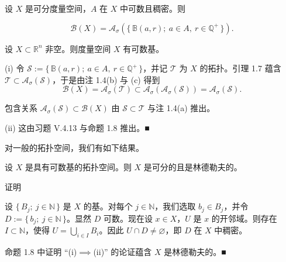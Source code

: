 \begin{corollary}

\begin{subitems}
\item

设 $ X $ 是可分度量空间，$ A $ 在 $ X $ 中可数且稠密。则

\[
\mathcal{B}(X) = \mathcal{A}_{\sigma}\left(\{\, \mathbb{B}(a, r) ;\ a \in A,\ r \in \mathbb{Q}^{+} \,\}\right) .
\]
\item

设 $ X \subset \mathbb{R}^{n} $ 非空。则度量空间 $ X $ 有可数基。

\proofhead
(i) 令 $ \mathcal{S} := \{\, \mathbb{B}(a, r) ;\ a \in A,\ r \in \mathbb{Q}^{+} \,\} $，并记 $ \mathcal{T} $ 为 $ X $ 的拓扑。引理 1.7 蕴含 $ \mathcal{T} \subset \mathcal{A}_{\sigma}(\mathcal{S}) $，于是由注 1.4(b) 与 (c) 得到
\[
\mathcal{B}(X) = \mathcal{A}_{\sigma}(\mathcal{T}) \subset \mathcal{A}_{\sigma}(\mathcal{A}_{\sigma}(\mathcal{S})) = \mathcal{A}_{\sigma}(\mathcal{S}) .
\]

包含关系 $ \mathcal{A}_{\sigma}(\mathcal{S}) \subset \mathcal{B}(X) $ 由 $ \mathcal{S} \subset \mathcal{T} $ 与注 1.4(a) 推出。

\end{subitems}

(ii) 这由习题 V.4.13 与命题 1.8 推出。\nobreak\hspace{0.35em}■

\end{corollary}

对一般的拓扑空间，我们有如下结果。

\begin{corollary}

设 $ X $ 是具有可数基的拓扑空间。则 $ X $ 是可分的且是林德勒夫的。

证明

\begin{subitems}
\item

设 $ \{\, B_{j} ;\ j \in \mathbb{N} \,\} $ 是 $ X $ 的基。对每个 $ j \in \mathbb{N} $，我们选取 $ b_{j} \in B_{j} $，并令 $ D := \{\, b_{j} ;\ j \in \mathbb{N} \,\} $。显然 $ D $ 可数。现在设 $ x \in X $，$ U $ 是 $ x $ 的开邻域。则存在 $ I \subset \mathbb{N} $，使得 $ U = \bigcup_{i \in I} B_{i} $。因此 $ U \cap D \ne \varnothing $，即 $ D $ 在 $ X $ 中稠密。

\item

命题 1.8 中证明 “(i)$ \implies $(ii)” 的论证蕴含 $ X $ 是林德勒夫的。\nobreak\hspace{0.35em}■

\end{subitems}

\end{corollary}

